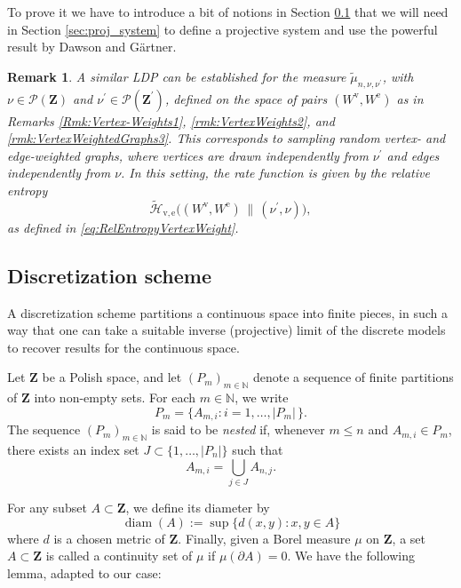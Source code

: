 \documentclass[12pt,twoside,a4paper]{article}
\newtheorem{remark}[theorem]{Remark}
\newcommand{\Space}{\mathbf{Z}}
\begin{document}
To prove it we have to introduce a bit of notions in Section \ref{sec:disc_scheme} that we will need in Section \ref{sec:proj_system} to define a projective system and use the powerful result by Dawson and G\"artner. 


\begin{remark}
\label{rmk:VertesWeights4}
A similar LDP can be established for the measure $\widetilde{\mu}_{n,\nu,\nu^{\prime}}$, with $\nu \in \mathcal{P}(\Space)$ and $\nu^{\prime} \in \mathcal{P}(\Space^{\prime})$, defined on the space of pairs $(W^{\mathrm{v}},W^{\mathrm{e}})$ as in Remarks \ref{Rmk:Vertex-Weights1}, \ref{rmk:VertexWeights2}, and \ref{rmk:VertexWeightedGraphs3}. This corresponds to sampling random vertex- and edge-weighted graphs, where vertices are drawn independently from $\nu^{\prime}$ and edges independently from $\nu$. In this setting, the rate function is given by the relative entropy
\[
\widetilde{\mathcal{H}}_{\mathrm{v},\mathrm{e}}\big((W^{\mathrm{v}},W^{\mathrm{e}})\,\big\|\,(\nu^{\prime},\nu)\big),
\]
as defined in \eqref{eq:RelEntropyVertexWeight}.
\end{remark}

\subsection{Discretization scheme}\label{sec:disc_scheme}
A discretization scheme partitions a continuous space into finite pieces, in such a way that one can take a suitable inverse (projective) limit of the discrete models to recover results for the continuous space.

Let $\Space$ be a Polish space, and let $(P_m)_{m \in \mathbb{N}}$ denote a sequence of finite partitions of $\Space$ into non-empty sets. For each $m \in \mathbb{N}$, we write
\[P_m = \{A_{m,i} : i = 1, \ldots, |P_m|\,\}.\]
The sequence $(P_m)_{m \in \mathbb{N}}$ is said to be \emph{nested} if, whenever $m \leq n$ and $A_{m,i} \in P_m$, there exists an index set $J \subset \{1, \ldots, |P_n|\}$ such that
\[A_{m,i} = \bigcup_{j \in J} A_{n,j}.\]

For any subset $A \subset \Space$, we define its diameter by
\[\operatorname{diam}(A) := \sup\{d(x,y) : x,y \in A\}\]
where $d$ is a chosen metric of $\Space$.
Finally, given a Borel measure $\mu$ on $\Space$, a set $A \subset \Space$ is called a continuity set of $\mu$ if $\mu(\partial A) = 0$. We have the following lemma, adapted to our case:
\end{document}
